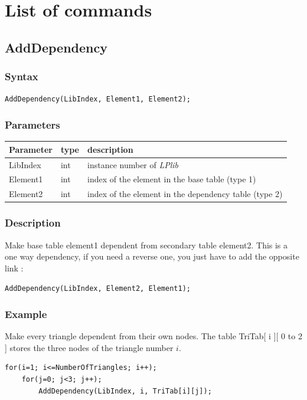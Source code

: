 \documentclass[a4paper,12pt]{article}
\begin{document}
%
%


\section{List of commands}

\subsection{AddDependency}

\subsubsection*{Syntax}
\tt{AddDependency(LibIndex, Element1, Element2);}
\normalfont

\subsubsection*{Parameters}
\begin{tabular}{|m{2cm}|m{1.5cm}|m{10.5cm}|}
\hline
Parameter  & type   & description \\
\hline
LibIndex   & int    & instance number of \emph{LPlib} \\
\hline
Element1   & int    & index of the element in the base table (type 1) \\
\hline
Element2   & int    & index of the element in the dependency table (type 2) \\
\hline
\end{tabular}

\subsubsection*{Description}
Make base table element1 dependent from secondary table element2. This is a one way dependency, if you need a reverse one, you just have to add the opposite link :
\medskip

\tt{AddDependency(LibIndex, Element2, Element1);}
\normalfont

\subsubsection*{Example}
Make every triangle dependent from their own nodes. The table TriTab[ i ][ 0 to 2 ] stores the three nodes of the triangle number $i$.

\begin{tt}
\begin{verbatim}
for(i=1; i<=NumberOfTriangles; i++);
    for(j=0; j<3; j++);
        AddDependency(LibIndex, i, TriTab[i][j]);
\end{verbatim}
\end{tt}
\normalfont
\end{document}

